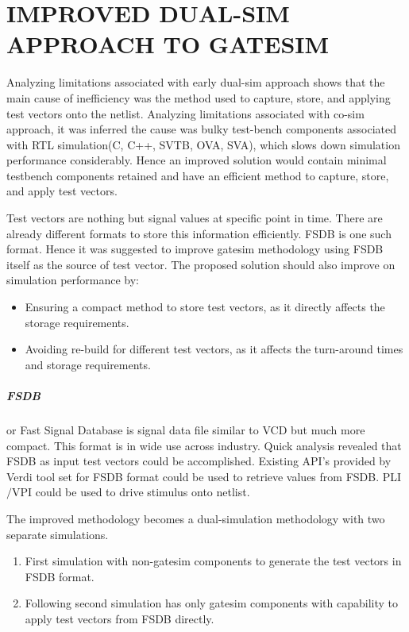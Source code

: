 \chapter{IMPROVED DUAL-SIM APPROACH TO GATESIM}
\label{chap:dualsim.tex}
Analyzing limitations associated with early dual-sim approach shows that the main cause of inefficiency was the method used to capture, store, and applying test vectors onto the netlist. Analyzing limitations associated with co-sim approach, it was inferred the cause was bulky test-bench components associated with RTL simulation(C, C++, SVTB, OVA, SVA), which slows down simulation performance considerably. Hence an improved solution would contain minimal testbench components retained and have an efficient method to capture, store, and apply test vectors. 

Test vectors are nothing but signal values at specific point in time. There are already different formats to store this information efficiently. FSDB  is one such format. Hence it was suggested to improve gatesim methodology using FSDB itself as the source of test vector. The proposed solution should also improve on simulation performance by:

\begin{itemize}
	\item Ensuring a compact method to store test vectors, as it directly affects the storage requirements.
	\item Avoiding re-build for different test vectors, as it affects the turn-around times and storage requirements.
\end{itemize}

\paragraph{FSDB} or Fast Signal Database is signal data file similar to VCD  but much more compact. This format is in wide use across industry.  Quick analysis revealed that FSDB as input test vectors could be accomplished. Existing API's  provided by Verdi\cite{SS:Verdi} tool set for FSDB format could be used to retrieve values from FSDB. PLI$/$VPI\cite{ieee:v:2005} could be used to drive stimulus onto netlist.


The improved methodology becomes a dual-simulation methodology with two separate simulations.
\begin{enumerate}
	\item First simulation with non-gatesim components to generate the test vectors in FSDB format.
	\item Following second simulation has only gatesim components with capability to apply test vectors from FSDB directly.
\end{enumerate}




